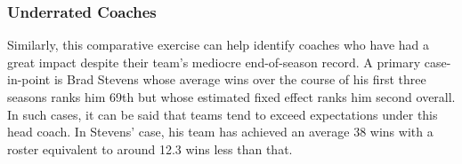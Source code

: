 \subsubsection{Underrated Coaches}

Similarly, this comparative exercise can help identify coaches who have had a great impact despite their team's mediocre end-of-season record. A primary case-in-point is Brad Stevens whose average wins over the course of his first three seasons ranks him 69th but whose estimated fixed effect ranks him second overall. In such cases, it can be said that teams tend to exceed expectations under this head coach. In Stevens' case, his team has achieved an average 38 wins with a roster equivalent to around 12.3 wins less than that. 
